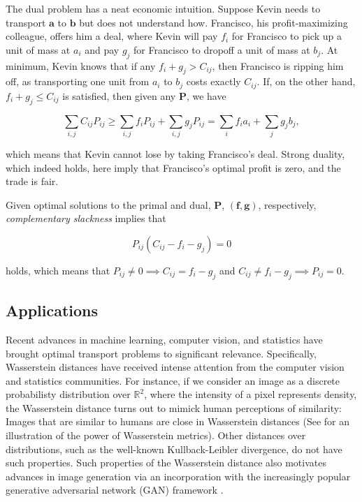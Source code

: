 \documentclass{article}
\renewcommand{\b}{\mathbf}
\theoremstyle{definition}
\theoremstyle{remark}
\begin{document}
The dual problem has a neat economic intuition. Suppose Kevin needs to transport
$\b a$ to $\b b$ but does not understand how. Francisco, his profit-maximizing
colleague, offers him a deal, where Kevin will pay $f_i$ for Francisco to pick
up a unit of mass at $a_i$ and pay $g_j$ for Francisco to dropoff a unit of mass
at $b_j.$ At minimum, Kevin knows that if any $f_i + g_j > C_ {ij}$, then
Francisco is ripping him off, as transporting one unit from $a_i$ to $b_j$ costs
exactly $C_{ij}$. If, on the other hand, $f_i + g_j \le C_{ij}$ is satisfied,
then given any $\b P$, we have

\[
\sum_{i,j} C_{ij}P_{ij} \ge \sum_{i,j} f_i P_{ij} + \sum_{i,j} g_j P_{ij} =
\sum_i f_i a_i + \sum_j g_j b_j \tag{Weak duality},
\]


which means that Kevin cannot lose by taking Francisco's deal. Strong duality,
which indeed holds, here imply that Francisco's optimal profit is zero, and the
trade is fair.


Given optimal solutions to the primal and dual, $\b P$, $(\b f, \b g)$,
respectively, \emph{complementary slackness} implies that

\[ P_{ij} (C_{ij} - f_i - g_j) = 0 \tag{Complementary slackness} \]

holds, which means that $P_{ij} \neq 0 \implies C_{ij} = f_i - g_j$ and
$C_{ij} \neq f_i - g_j \implies P_{ij} = 0$. 
\subsection{Applications} %
\label{sub:applications}

Recent advances in machine learning, computer vision, and statistics have
 brought optimal transport problems to significant relevance. Specifically,
 Wasserstein distances have received intense attention from the computer vision
 and statistics communities. For instance, if we consider an image as a discrete
 probabilisty distribution over $\mathbb{R}^2$, where the intensity of a pixel represents density, the Wasserstein distance turns
 out to mimick human perceptions of similarity: Images that are similar to
 humans are close in Wasserstein distances (See \cite{solomon2015convolutional}
 for an illustration of the power of Wasserstein metrics). Other distances over
 distributions, such as the well-known Kullback-Leibler divergence, do not have
 such properties. Such properties of the Wasserstein distance also motivates
 advances in image generation via an incorporation with the increasingly popular
 generative adversarial network (GAN) framework \cite{arjovsky2017wasserstein}.
 
\end{document}
